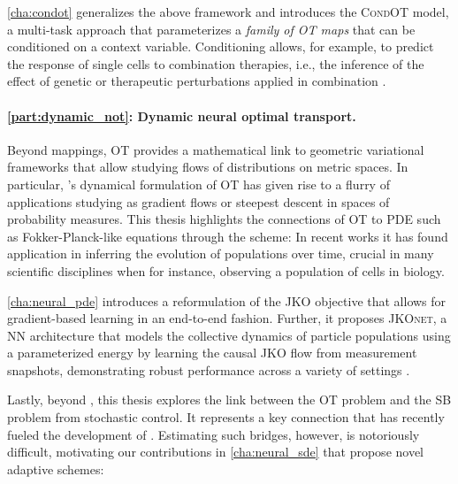 \cref{cha:condot} generalizes the above framework and introduces the \textsc{CondOT} model, a multi-task approach that parameterizes a \emph{family of \acrshort{OT} maps} that can be conditioned on a context variable. Conditioning allows, for example, to predict the response of single cells to combination therapies, i.e., the inference of the effect of genetic or therapeutic perturbations applied in combination \citep{bunne2022supervised}.


\paragraph{\cref{part:dynamic_not}: Dynamic neural optimal transport.}

Beyond mappings, \acrshort{OT} provides a mathematical link to geometric variational frameworks that allow studying flows of distributions on metric spaces.
In particular, \citeauthor{brenier1987decomposition}'s dynamical formulation of \acrshort{OT} has given rise to a flurry of applications studying  as gradient flows or steepest descent in spaces of probability measures.
This thesis highlights the connections of \acrshort{OT} to \acrshort{PDE} such as Fokker-Planck-like equations through the \citeauthor*{jordan1998variational} scheme: In recent works \citep{bunne2022proximal, alvarez2021optimizing, mokrov2021large, benamou2016augmented} 
it has found application in inferring the evolution of populations over time, crucial in many scientific disciplines when for instance, observing a population of cells in biology.

\cref{cha:neural_pde} introduces a reformulation of the \acrfull{JKO} objective that allows for gradient-based learning in an end-to-end fashion. Further, it proposes \textsc{JKOnet}, a \acrlong{NN} architecture that models the collective dynamics of particle populations using a parameterized energy by learning the causal \acrshort{JKO} flow from measurement snapshots,
demonstrating robust performance across a variety of settings \citep{bunne2022proximal}.

Lastly, beyond , this thesis explores the link between the \acrlong{OT} problem and the \acrfull{SB} problem from stochastic control. It represents a key connection that has recently fueled the development of  \citep{de2021diffusion, chen2021stochastic, liu2022deep, bunne2022recovering}. Estimating such bridges, however, is notoriously difficult, motivating our contributions in \cref{cha:neural_sde} that propose novel adaptive schemes:

